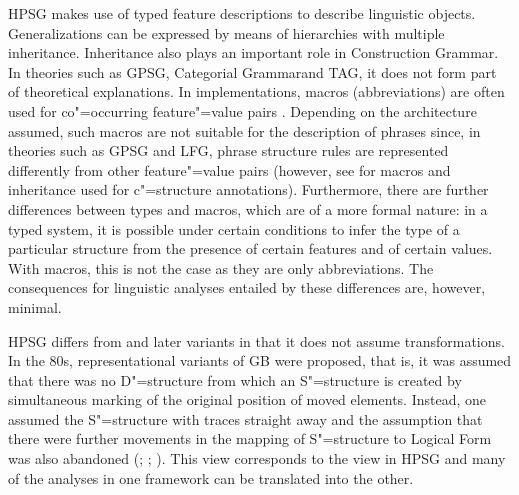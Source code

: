 HPSG makes use of typed feature descriptions to describe linguistic objects. Generalizations can be expressed by means of hierarchies with multiple inheritance.
Inheritance also plays an important role in Construction Grammar\indexcxg. In theories such as GPSG\indexgpsg, Categorial Grammar\indexcg and TAG\indextag, it
does not form part of theoretical explanations. In implementations, macros (abbreviations) are often used for co"=occurring feature"=value pairs
\citep*{DKK2004a}. Depending on the architecture assumed, such macros are not suitable for the description of phrases since, in theories such as GPSG\indexgpsg
and LFG\indexlfg, phrase structure rules are represented differently from other feature"=value pairs (however, see
 for macros and inheritance used for c"=structure annotations). Furthermore, there are further differences between types and macros, which are of a
more formal nature: in a typed system, it is possible under certain conditions to infer the type of a particular structure from the presence
of certain features and of certain values. With macros, this is not the case as they are only abbreviations. The consequences for linguistic analyses entailed by these differences are, however, minimal.

HPSG differs from \gbt and later variants in that it does not assume transformations. In the 80s, representational variants of GB were proposed, that is,
it was assumed that there was no D"=structure from which an S"=structure is created by simultaneous marking of the original position of moved elements.
Instead, one assumed the S"=structure with traces straight away and the assumption that there were further movements in the mapping of S"=structure to Logical
Form was also abandoned (\citealp{Koster78b-u}; \citealp[Section~1.4]{Haider93a};
\citealp[]{Frey93a}). This view corresponds to the view in HPSG and many of the analyses in one framework can be translated into the other.

